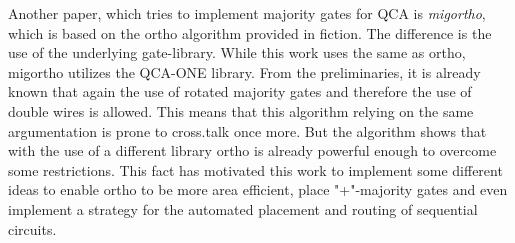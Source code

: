 Another paper, which tries to implement majority gates for QCA is \textit{migortho}, which is based on the ortho algorithm provided in fiction. The difference is the use of the underlying gate-library. While this work uses the same as ortho, migortho utilizes the QCA-ONE library. From the preliminaries, it is already known that again the use of rotated majority gates and therefore the use of double wires is allowed. This means that this algorithm relying on the same argumentation is prone to cross.talk once more. But the algorithm shows that with the use of a different library ortho is already powerful enough to overcome some restrictions. This fact has motivated this work to implement some different ideas to enable ortho to be more area efficient, place "+"-majority gates and even implement a strategy for the automated placement and routing of sequential circuits.

